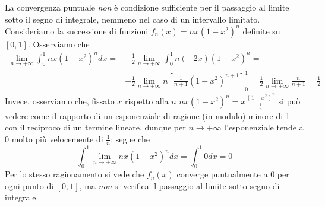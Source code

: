 \begin{example}
	La convergenza puntuale \textit{non} è condizione sufficiente per il passaggio al limite sotto il segno di integrale, nemmeno nel caso di un intervallo limitato.
	Consideriamo la successione di funzioni $f_n\left(x\right)=nx\left(1-x^2\right)^n$ definite su $\left[0,1\right]$. Osserviamo che
	\begin{align*}
		\lim_{n\to+\infty}\int_{0}^{1}nx\left(1-x^2\right)^ndx=&-\frac{1}{2}\lim_{n\to+\infty}\int_{0}^{1}n\left(-2x\right)\left(1-x^2\right)^n=\\
		=&-\frac{1}{2}\lim_{n\to+\infty}n\left[\frac{1}{n+1}\left(1-x^2\right)^{n+1}\right]_{0}^{1}=\frac{1}{2}\lim_{n\to+\infty}\frac{n}{n+1}=\frac{1}{2}
	\end{align*}
Invece, osserviamo che, fissato $x$ rispetto alla $n$ $nx\left(1-x^2\right)^n=x\frac{\left(1-x^2\right)^n}{\frac{1}{n}}$ si può vedere come il rapporto di un esponenziale di ragione (in modulo) minore di 1 con il reciproco di un termine lineare, dunque per $n\to+\infty$ l'esponenziale tende a $0$ molto più velocemente di $\frac{1}{n}$: segue che
	\begin{equation*}
	\int_{0}^{1}\lim_{n\to+\infty}nx\left(1-x^2\right)^ndx=\int_{0}^{1}0dx=0
\end{equation*}
Per lo stesso ragionamento si vede che $f_n\left(x\right)$ converge puntualmente a $0$ per ogni punto di $\left[0,1\right]$, ma \textit{non} si verifica il passaggio al limite sotto segno di integrale.
\end{example}
